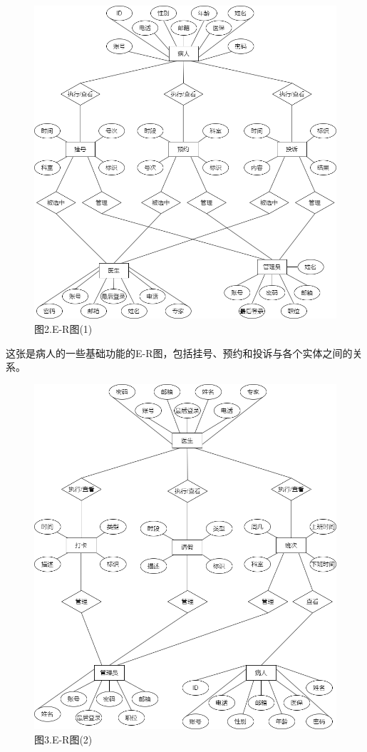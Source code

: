 \documentclass[24pt,a4paper]{article}%
\begin{document}
\begin{figure}[H]
    \centering
    \includegraphics[width=1\textwidth]{image/ERGraph1.png}
    \caption*{图2.E-R图(1)}
\end{figure}
这张是病人的一些基础功能的E-R图，包括挂号、预约和投诉与各个实体之间的关系。
\begin{figure}[H]
    \centering
    \includegraphics[width=1\textwidth]{image/ERGraph2.png}
    \caption*{图3.E-R图(2)}
\end{figure}
\end{document}
